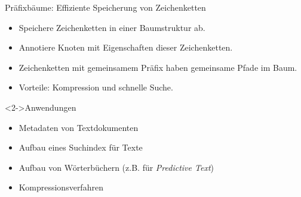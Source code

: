\begin{frame}
    \begin{block}{Präfixbäume: Effiziente Speicherung von Zeichenketten}
        \begin{itemize}
            \item Speichere Zeichenketten in einer Baumstruktur ab.
            \item Annotiere Knoten mit Eigenschaften dieser Zeichenketten.
            \item Zeichenketten mit gemeinsamem Präfix haben gemeinsame Pfade im Baum.
            \item Vorteile: Kompression und schnelle Suche.
        \end{itemize}
    \end{block}
    \begin{block}<2->{Anwendungen}
        \begin{itemize}
            \item Metadaten von Textdokumenten
            \item Aufbau eines Suchindex für Texte
            \item Aufbau von Wörterbüchern (z.B. für \emph{Predictive Text})
            \item Kompressionsverfahren
        \end{itemize}
    \end{block}
\end{frame}
